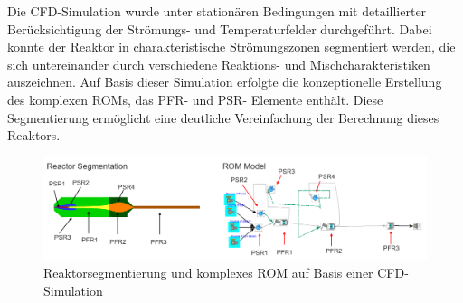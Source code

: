         Die CFD-Simulation wurde unter stationären Bedingungen mit detaillierter Berücksichtigung der Strömungs- und Temperaturfelder durchgeführt. Dabei konnte der Reaktor in charakteristische Strömungszonen segmentiert werden, die sich untereinander durch verschiedene Reaktions- und Mischcharakteristiken auszeichnen. Auf Basis dieser Simulation erfolgte die konzeptionelle Erstellung des komplexen ROMs, das PFR- und PSR- Elemente enthält. Diese Segmentierung ermöglicht eine deutliche Vereinfachung der Berechnung dieses Reaktors. 
        
        \begin{figure}[H]
            \centering
            \includegraphics[width=1\linewidth]{img/sonstiges/Reactor Segmentation.png}
            \caption{Reaktorsegmentierung und komplexes ROM auf Basis einer CFD-Simulation \cite{gonzales}}
            \label{fig:reaktorsegmentierung}
        \end{figure}
        